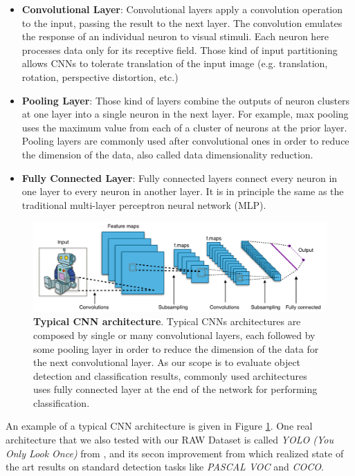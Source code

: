 \begin{itemize}
	\item \textbf{Convolutional Layer}: Convolutional layers apply a convolution operation to the input, passing the result to the next layer. The convolution emulates the response of an individual neuron to visual stimuli. Each neuron here processes data only for its receptive field. Those kind of input partitioning allows CNNs to tolerate translation of the input image (e.g. translation, rotation, perspective distortion, etc.)
	\item \textbf{Pooling Layer}: Those kind of layers combine the outputs of neuron clusters at one layer into a single neuron in the next layer. For example, max pooling uses the maximum value from each of a cluster of neurons at the prior layer. Pooling layers are commonly used after convolutional ones in order to reduce the dimension of the data, also called data dimensionality reduction.
	\item \textbf{Fully Connected Layer}: Fully connected layers connect every neuron in one layer to every neuron in another layer. It is in principle the same as the traditional multi-layer perceptron neural network (MLP).
\end{itemize}

\begin{figure}
    \centering
    \includegraphics[width=\textwidth]{figures/1_perception_and_sensing_in_robotics/typical_cnn}
    \caption{\textbf{Typical CNN architecture}. Typical CNNs architectures are composed by single or many convolutional layers, each followed by some pooling layer in order to reduce the dimension of the data for the next convolutional layer. As our scope is to evaluate object detection and classification results, commonly used architectures uses fully connected layer at the end of the network for performing classification.} 
    \label{fig:typical_cnn}
\end{figure}

An example of a typical CNN architecture is given in Figure \ref{fig:typical_cnn}. One real architecture that we also tested with our RAW Dataset is called \emph{YOLO (You Only Look Once)} from \cite{Redmon2016YOLO}, and its secon improvement from \cite{Redmon2017YOLO2} which realized state of the art results on standard detection tasks like \emph{PASCAL VOC} and \emph{COCO}.

